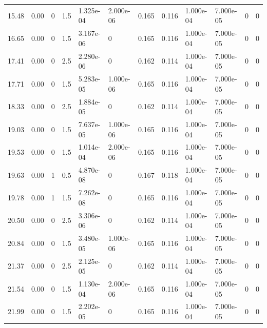 \documentclass[preview]{standalone}
\begin{document}
{{\begin{tabular}{L{1.2cm}C{1.2cm} C{0.3cm}C{0.5cm} C{1.4cm}C{1.4cm} C{1.4cm}C{1.4cm} C{1.6cm}C{1.6cm} C{1.6cm}C{1.6cm}}
  15.48  &  0.00  & 0     & 1.5 &  1.325e-04  & 2.000e-06  &  0.165&   0.116& 1.000e-04 & 7.000e-05   &  0 & 0  \\ 
  16.65  &  0.00  & 0     & 1.5 &  3.167e-06  & 0  &  0.165&   0.116& 1.000e-04 & 7.000e-05   &  0 & 0  \\ 
  17.41  &  0.00  & 0     & 2.5 &  2.280e-06  & 0  &  0.162&   0.114& 1.000e-04 & 7.000e-05   &  0 & 0  \\ 
  17.71  &  0.00  & 0     & 1.5 &  5.283e-05  & 1.000e-06  &  0.165&   0.116& 1.000e-04 & 7.000e-05   &  0 & 0  \\ 
  18.33  &  0.00  & 0     & 2.5 &  1.884e-05  & 0  &  0.162&   0.114& 1.000e-04 & 7.000e-05   &  0 & 0  \\ 
  19.03  &  0.00  & 0     & 1.5 &  7.637e-05  & 1.000e-06  &  0.165&   0.116& 1.000e-04 & 7.000e-05   &  0 & 0  \\ 
  19.53  &  0.00  & 0     & 1.5 &  1.014e-04  & 2.000e-06  &  0.165&   0.116& 1.000e-04 & 7.000e-05   &  0 & 0  \\ 
  19.63  &  0.00  & 1     & 0.5 &  4.870e-08  & 0  &  0.167&   0.118& 1.000e-04 & 7.000e-05   &  0 & 0  \\ 
  19.78  &  0.00  & 1     & 1.5 &  7.262e-08  & 0  &  0.165&   0.116& 1.000e-04 & 7.000e-05   &  0 & 0  \\ 
  20.50  &  0.00  & 0     & 2.5 &  3.306e-06  & 0  &  0.162&   0.114& 1.000e-04 & 7.000e-05   &  0 & 0  \\ 
  20.84  &  0.00  & 0     & 1.5 &  3.480e-05  & 1.000e-06  &  0.165&   0.116& 1.000e-04 & 7.000e-05   &  0 & 0  \\ 
  21.37  &  0.00  & 0     & 2.5 &  2.125e-05  & 0  &  0.162&   0.114& 1.000e-04 & 7.000e-05   &  0 & 0  \\ 
  21.54  &  0.00  & 0     & 1.5 &  1.130e-04  & 2.000e-06  &  0.165&   0.116& 1.000e-04 & 7.000e-05   &  0 & 0  \\ 
  21.99  &  0.00  & 0     & 1.5 &  2.202e-05  & 0  &  0.165&   0.116& 1.000e-04 & 7.000e-05   &  0 & 0  \\ 
\hline 
\end{tabular} 

}}
\end{document}
